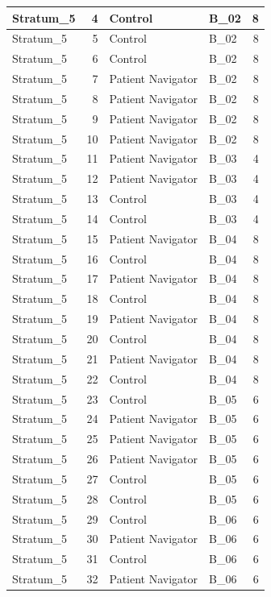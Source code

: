 \documentclass[
]{book}
\begin{document}
\begin{table}[H]
\begin{tabular}{l|r|l|l|r}
\hline
Stratum\_5 & 4 & Control & B\_02 & 8\\
\hline
Stratum\_5 & 5 & Control & B\_02 & 8\\
\hline
Stratum\_5 & 6 & Control & B\_02 & 8\\
\hline
Stratum\_5 & 7 & Patient Navigator & B\_02 & 8\\
\hline
Stratum\_5 & 8 & Patient Navigator & B\_02 & 8\\
\hline
Stratum\_5 & 9 & Patient Navigator & B\_02 & 8\\
\hline
Stratum\_5 & 10 & Patient Navigator & B\_02 & 8\\
\hline
Stratum\_5 & 11 & Patient Navigator & B\_03 & 4\\
\hline
Stratum\_5 & 12 & Patient Navigator & B\_03 & 4\\
\hline
Stratum\_5 & 13 & Control & B\_03 & 4\\
\hline
Stratum\_5 & 14 & Control & B\_03 & 4\\
\hline
Stratum\_5 & 15 & Patient Navigator & B\_04 & 8\\
\hline
Stratum\_5 & 16 & Control & B\_04 & 8\\
\hline
Stratum\_5 & 17 & Patient Navigator & B\_04 & 8\\
\hline
Stratum\_5 & 18 & Control & B\_04 & 8\\
\hline
Stratum\_5 & 19 & Patient Navigator & B\_04 & 8\\
\hline
Stratum\_5 & 20 & Control & B\_04 & 8\\
\hline
Stratum\_5 & 21 & Patient Navigator & B\_04 & 8\\
\hline
Stratum\_5 & 22 & Control & B\_04 & 8\\
\hline
Stratum\_5 & 23 & Control & B\_05 & 6\\
\hline
Stratum\_5 & 24 & Patient Navigator & B\_05 & 6\\
\hline
Stratum\_5 & 25 & Patient Navigator & B\_05 & 6\\
\hline
Stratum\_5 & 26 & Patient Navigator & B\_05 & 6\\
\hline
Stratum\_5 & 27 & Control & B\_05 & 6\\
\hline
Stratum\_5 & 28 & Control & B\_05 & 6\\
\hline
Stratum\_5 & 29 & Control & B\_06 & 6\\
\hline
Stratum\_5 & 30 & Patient Navigator & B\_06 & 6\\
\hline
Stratum\_5 & 31 & Control & B\_06 & 6\\
\hline
Stratum\_5 & 32 & Patient Navigator & B\_06 & 6\\

\end{tabular}
\end{table}
\end{document}
